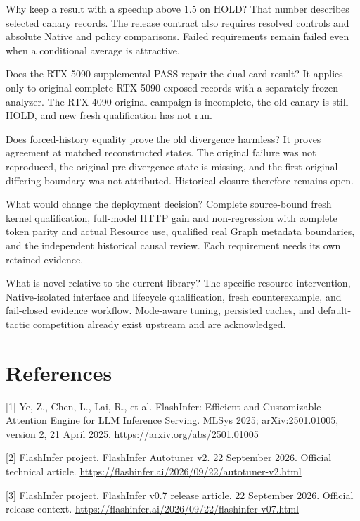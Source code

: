 \documentclass[11pt,a4paper]{article}
\begin{document}
Why keep a result with a speedup above 1.5 on HOLD? That number describes selected canary records. The release contract also requires resolved controls and absolute Native and policy comparisons. Failed requirements remain failed even when a conditional average is attractive.


Does the RTX 5090 supplemental PASS repair the dual-card result? It applies only to original complete RTX 5090 exposed records with a separately frozen analyzer. The RTX 4090 original campaign is incomplete, the old canary is still HOLD, and new fresh qualification has not run.


Does forced-history equality prove the old divergence harmless? It proves agreement at matched reconstructed states. The original failure was not reproduced, the original pre-divergence state is missing, and the first original differing boundary was not attributed. Historical closure therefore remains open.


What would change the deployment decision? Complete source-bound fresh kernel qualification, full-model HTTP gain and non-regression with complete token parity and actual Resource use, qualified real Graph metadata boundaries, and the independent historical causal review. Each requirement needs its own retained evidence.


What is novel relative to the current library? The specific resource intervention, Native-isolated interface and lifecycle qualification, fresh counterexample, and fail-closed evidence workflow. Mode-aware tuning, persisted caches, and default-tactic competition already exist upstream and are acknowledged.


\clearpage

\section*{References}


[1] Ye, Z., Chen, L., Lai, R., et al. FlashInfer: Efficient and Customizable Attention Engine for LLM Inference Serving. MLSys 2025; arXiv:2501.01005, version 2, 21 April 2025. \url{https://arxiv.org/abs/2501.01005}


[2] FlashInfer project. FlashInfer Autotuner v2. 22 September 2026. Official technical article. \url{https://flashinfer.ai/2026/09/22/autotuner-v2.html}


[3] FlashInfer project. FlashInfer v0.7 release article. 22 September 2026. Official release context. \url{https://flashinfer.ai/2026/09/22/flashinfer-v07.html}
\end{document}

